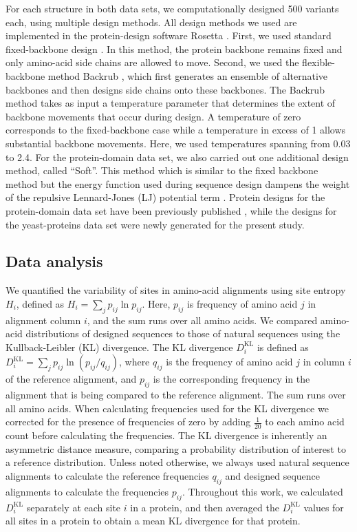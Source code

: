 \documentclass[12pt]{article}
\begin{document}
For each structure in both data sets, we computationally designed 500 variants each, using multiple design methods. All design methods we used are implemented in the protein-design software Rosetta \citep{LeaverFayetal2011}. First, we used standard fixed-backbone design \citep{Kuhlman2003}. In this method, the protein backbone remains fixed and only amino-acid side chains are allowed to move. Second, we used the flexible-backbone method Backrub \citep{Smith2008}, which first generates an ensemble of alternative backbones and then designs side chains onto these backbones. The Backrub method takes as input a temperature parameter that determines the extent of backbone movements that occur during design. A temperature of zero corresponds to the fixed-backbone case while a temperature in excess of 1 allows substantial backbone movements. Here, we used temperatures spanning from 0.03 to 2.4. For the protein-domain data set, we also carried out one additional design method, called ``Soft''. This method which is similar to the fixed backbone method but the energy function used during sequence design dampens the weight of the repulsive Lennard-Jones (LJ) potential term \citep{OllikainenKortemme}.  Protein designs for the protein-domain data set have been previously published \citep{OllikainenKortemme}, while the designs for the yeast-proteins data set were newly generated for the present study.

\subsection{Data analysis}

We quantified the variability of sites in amino-acid alignments using site entropy $H_i$, defined as $H_i=\sum_{j}p_{ij}\ln p_{ij}$. Here, $p_{ij}$ is frequency of amino acid $j$ in alignment column $i$, and the sum runs over all amino acids. We compared amino-acid distributions of designed sequences to those of natural sequences using the Kullback-Leibler (KL) divergence. The KL divergence $D^\text{KL}_i$ is defined as $D^\text{KL}_i= \sum_j  p_{ij} \ln  (p_{ij}/q_{ij})$, where $q_{ij}$ is the frequency of amino acid $j$ in column $i$ of the reference alignment, and $p_{ij}$ is the corresponding frequency in the alignment that is being compared to the reference alignment. The sum runs over all amino acids.  When calculating frequencies used for the KL divergence we corrected for the presence of frequencies of zero by adding  $\frac{1}{20}$ to each amino acid count before calculating the frequencies. The KL divergence is inherently an asymmetric distance measure, comparing a probability distribution of interest to a reference distribution. Unless noted otherwise, we always used natural sequence alignments to calculate the reference frequencies $q_{ij}$ and designed sequence alignments to calculate the frequencies $p_{ij}$. Throughout this work, we calculated $D^\text{KL}_i$ separately at each site $i$ in a protein, and then averaged the $D^\text{KL}_i$ values for all sites in a protein to obtain a mean KL divergence for that protein. 
\end{document}
